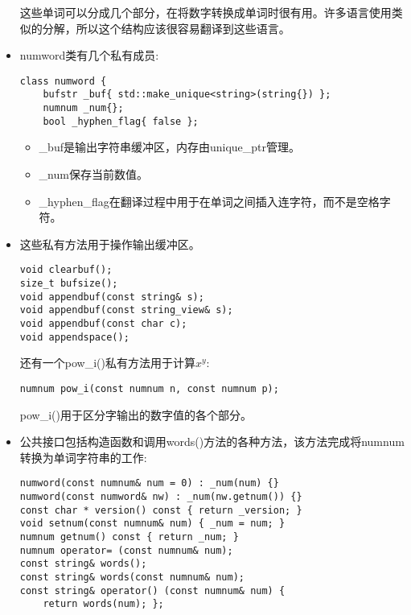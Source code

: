 \begin{itemize}
这些单词可以分成几个部分，在将数字转换成单词时很有用。许多语言使用类似的分解，所以这个结构应该很容易翻译到这些语言。

\item 
numword类有几个私有成员:

\begin{lstlisting}[style=styleCXX]
class numword {
	bufstr _buf{ std::make_unique<string>(string{}) };
	numnum _num{};
	bool _hyphen_flag{ false };
\end{lstlisting}

\begin{itemize}
\item 
\_buf是输出字符串缓冲区，内存由unique\_ptr管理。

\item 
\_num保存当前数值。

\item 
\_hyphen\_flag在翻译过程中用于在单词之间插入连字符，而不是空格字符。
\end{itemize}

\item 
这些私有方法用于操作输出缓冲区。

\begin{lstlisting}[style=styleCXX]
void clearbuf();
size_t bufsize();
void appendbuf(const string& s);
void appendbuf(const string_view& s);
void appendbuf(const char c);
void appendspace();
\end{lstlisting}

还有一个pow\_i()私有方法用于计算$x^y$:

\begin{lstlisting}[style=styleCXX]
numnum pow_i(const numnum n, const numnum p);
\end{lstlisting}

pow\_i()用于区分字输出的数字值的各个部分。

\item 
公共接口包括构造函数和调用words()方法的各种方法，该方法完成将numnum转换为单词字符串的工作:

\begin{lstlisting}[style=styleCXX]
numword(const numnum& num = 0) : _num(num) {}
numword(const numword& nw) : _num(nw.getnum()) {}
const char * version() const { return _version; }
void setnum(const numnum& num) { _num = num; }
numnum getnum() const { return _num; }
numnum operator= (const numnum& num);
const string& words();
const string& words(const numnum& num);
const string& operator() (const numnum& num) {
	return words(num); };
\end{lstlisting}


\end{itemize}
